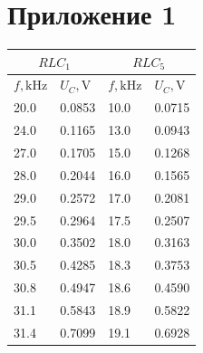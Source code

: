 \documentclass[12pt, a4paper]{article}
\begin{document}
\newpage
\section{Приложение 1}

\begin{minipage}{0.45\linewidth}
  \begin{table}[H]
    \begin{tabular}{|ll|ll|}
      \hline
      \multicolumn{2}{|c|}{$RLC_1$}                                 & \multicolumn{2}{c|}{$RLC_5$}                                 \\ \hline
      \multicolumn{1}{|l|}{$f, \mathrm{kHz}$} & $U_C, \mathrm{V}$ & \multicolumn{1}{l|}{$f, \mathrm{kHz}$} & $U_C, \mathrm{V}$ \\ \hline
      \multicolumn{1}{|l|}{20.0}              & 0.0853            & \multicolumn{1}{l|}{10.0}              & 0.0715            \\ \hline
      \multicolumn{1}{|l|}{24.0}              & 0.1165            & \multicolumn{1}{l|}{13.0}              & 0.0943            \\ \hline
      \multicolumn{1}{|l|}{27.0}              & 0.1705            & \multicolumn{1}{l|}{15.0}              & 0.1268            \\ \hline
      \multicolumn{1}{|l|}{28.0}              & 0.2044            & \multicolumn{1}{l|}{16.0}              & 0.1565            \\ \hline
      \multicolumn{1}{|l|}{29.0}              & 0.2572            & \multicolumn{1}{l|}{17.0}              & 0.2081            \\ \hline
      \multicolumn{1}{|l|}{29.5}              & 0.2964            & \multicolumn{1}{l|}{17.5}              & 0.2507            \\ \hline
      \multicolumn{1}{|l|}{30.0}              & 0.3502            & \multicolumn{1}{l|}{18.0}              & 0.3163            \\ \hline
      \multicolumn{1}{|l|}{30.5}              & 0.4285            & \multicolumn{1}{l|}{18.3}              & 0.3753            \\ \hline
      \multicolumn{1}{|l|}{30.8}              & 0.4947            & \multicolumn{1}{l|}{18.6}              & 0.4590            \\ \hline
      \multicolumn{1}{|l|}{31.1}              & 0.5843            & \multicolumn{1}{l|}{18.9}              & 0.5822            \\ \hline
      \multicolumn{1}{|l|}{31.4}              & 0.7099            & \multicolumn{1}{l|}{19.1}              & 0.6928            \\ \hline

\end{tabular}
\end{table}
\end{minipage}
\end{document}
